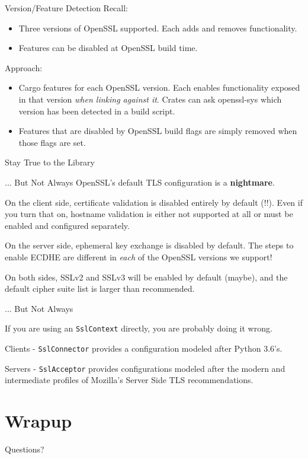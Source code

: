 \documentclass{beamer}
\begin{document}
\begin{frame}{Version/Feature Detection}
    Recall:
    \begin{itemize}
        \item Three versions of OpenSSL supported. Each adds and removes
            functionality.
        \item Features can be disabled at OpenSSL build time.
    \end{itemize}

    Approach:
    \begin{itemize}
        \item Cargo features for each OpenSSL version. Each enables
            functionality exposed in that version \emph{when linking against
            it}. Crates can ask openssl-sys which version has been detected in
            a build script.
        \item Features that are disabled by OpenSSL build flags are simply
            removed when those flags are set.
    \end{itemize}
\end{frame}

\begin{frame}{Stay True to the Library}

\end{frame}

\begin{frame}[fragile]{... But Not Always}
    OpenSSL's default TLS configuration is a \textbf{nightmare}.

    On the client side, certificate validation is disabled entirely by default
    (!!). Even if you turn that on, hostname validation is either not supported
    at all or must be enabled and configured separately.

    On the server side, ephemeral key exchange is disabled by default. The
    steps to enable ECDHE are different in \emph{each} of the OpenSSL versions
    we support!

    On both sides, SSLv2 and SSLv3 will be enabled by default (maybe), and the
    default cipher suite list is larger than recommended.
\end{frame}

\begin{frame}[fragile]{... But Not Always}
    \begin{center}
        \Large If you are using an \verb!SslContext! directly, you are probably
        doing it wrong.
    \end{center}

    \pause

    Clients - \verb!SslConnector! provides a configuration modeled after Python
    3.6's.

    Servers - \verb!SslAcceptor! provides configurations modeled after the
    modern and intermediate profiles of Mozilla's Server Side TLS
    recommendations.
\end{frame}

\section{Wrapup}

\begin{frame}{Questions?}
\end{frame}
\end{document}
